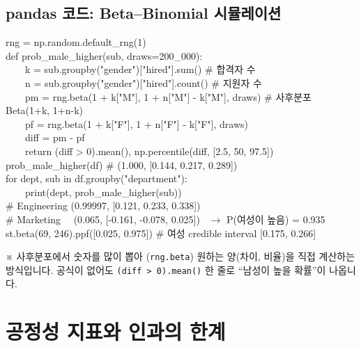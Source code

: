 \documentclass[11pt,a4paper]{article}
\newcommand{\code}[1]{\texttt{#1}}
\newcommand{\aside}[1]{{\footnotesize\color{black!65}#1}}
\begin{document}
\subsection*{pandas 코드: Beta–Binomial 시뮬레이션}
\begin{codebox}
rng = np.random.default\_rng(1)\\
def prob\_male\_higher(sub, draws=200\_000):\\
\ \ \ \ k = sub.groupby("gender")["hired"].sum() \hfill \# 합격자 수\\
\ \ \ \ n = sub.groupby("gender")["hired"].count() \hfill \# 지원자 수\\
\ \ \ \ pm = rng.beta(1 + k["M"], 1 + n["M"] - k["M"], draws) \hfill \# 사후분포 Beta(1+k, 1+n-k)\\
\ \ \ \ pf = rng.beta(1 + k["F"], 1 + n["F"] - k["F"], draws)\\
\ \ \ \ diff = pm - pf\\
\ \ \ \ return (diff > 0).mean(), np.percentile(diff, [2.5, 50, 97.5])\\[3pt]
prob\_male\_higher(df) \hfill \# (1.000, [0.144, 0.217, 0.289])\\
for dept, sub in df.groupby("department"):\\
\ \ \ \ print(dept, prob\_male\_higher(sub))\\
\# Engineering (0.99997, [0.121, 0.233, 0.338])\\
\# Marketing \ \ (0.065, [-0.161, -0.078, 0.025]) \ $\to$ P(여성이 높음) = 0.935\\[3pt]
st.beta(69, 246).ppf([0.025, 0.975]) \hfill \# 여성 credible interval [0.175, 0.266]
\end{codebox}
\aside{※ 사후분포에서 숫자를 많이 뽑아 (\code{rng.beta}) 원하는 양(차이, 비율)을 직접 계산하는 방식입니다. 공식이 없어도 \code{(diff > 0).mean()} 한 줄로 ``남성이 높을 확률''이 나옵니다.}

\section{공정성 지표와 인과의 한계}
\end{document}
